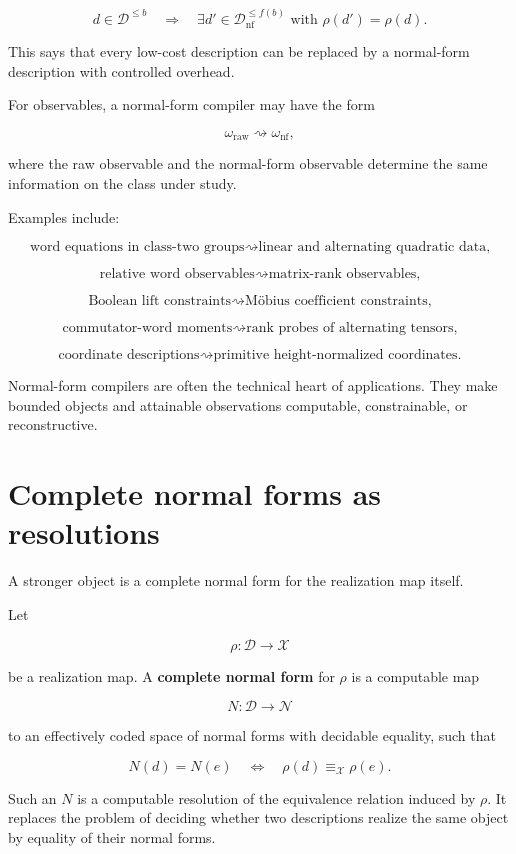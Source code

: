 \documentclass[11pt]{article}
\begin{document}
\[
d\in\mathcal D^{\leq b}
\quad\Longrightarrow\quad
\exists d'\in\mathcal D_{\mathrm{nf}}^{\leq f(b)}
\text{ with }
\rho(d')=\rho(d).
\]

This says that every low-cost description can be replaced by a normal-form description with controlled overhead.

For observables, a normal-form compiler may have the form

\[
\omega_{\mathrm{raw}}
\rightsquigarrow
\omega_{\mathrm{nf}},
\]

where the raw observable and the normal-form observable determine the same information on the class under study.

Examples include:

\[
\text{word equations in class-two groups}
\rightsquigarrow
\text{linear and alternating quadratic data,}
\]

\[
\text{relative word observables}
\rightsquigarrow
\text{matrix-rank observables,}
\]

\[
\text{Boolean lift constraints}
\rightsquigarrow
\text{Möbius coefficient constraints,}
\]

\[
\text{commutator-word moments}
\rightsquigarrow
\text{rank probes of alternating tensors,}
\]

\[
\text{coordinate descriptions}
\rightsquigarrow
\text{primitive height-normalized coordinates.}
\]

Normal-form compilers are often the technical heart of applications. They make bounded objects and attainable observations computable, constrainable, or reconstructive.


\section{Complete normal forms as resolutions}

A stronger object is a complete normal form for the realization map itself.

Let

\[
\rho:\mathcal D\to\mathcal X
\]

be a realization map. A \textbf{complete normal form} for \(\rho\) is a computable map

\[
N:\mathcal D\to\mathcal N
\]

to an effectively coded space of normal forms with decidable equality, such that

\[
N(d)=N(e)
\quad\Longleftrightarrow\quad
\rho(d)\equiv_\mathcal X\rho(e).
\]

Such an \(N\) is a computable resolution of the equivalence relation induced by \(\rho\). It replaces the problem of deciding whether two descriptions realize the same object by equality of their normal forms.
\end{document}
